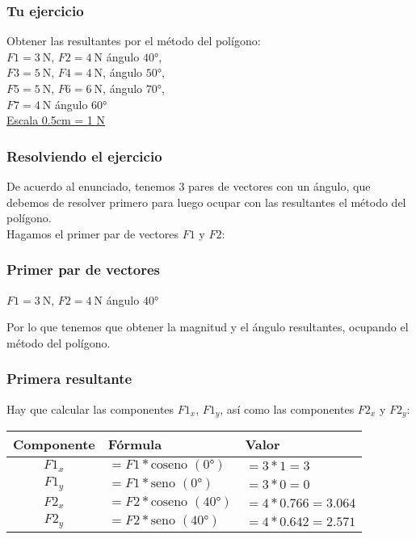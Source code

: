 \documentclass[14pt, xcolor={usenames,dvipsnames}]{beamer}
\begin{document}
\begin{frame}
\frametitle{Tu ejercicio}
Obtener las resultantes por el método del polígono:
\\[0.5em]
$F1 = \SI{3}{\newton}$, $F2 = \SI{4}{\newton}$  ángulo $\ang{40}$, \\[0.5em]
$F3 = \SI{5}{\newton}$, $F4 = \SI{4}{\newton}$, ángulo $\ang{50}$, \\[0.5em]
$F5 = \SI{5}{\newton}$, $F6 = \SI{6}{\newton}$, ángulo $\ang{70}$,\\[0.5em]
$F7 = \SI{4}{\newton}$ ángulo $\ang{60}$
\\[0.5em]
\underline{Escala 0.5cm = 1 N}
\end{frame}
\begin{frame}
\frametitle{Resolviendo el ejercicio}
De acuerdo al enunciado, tenemos 3 pares de vectores con un ángulo, que debemos de resolver primero para luego ocupar con las resultantes el método del polígono.
\\
\bigskip
\pause
Hagamos el primer par de vectores $F1$ y $F2$:
\end{frame}
\begin{frame}
\frametitle{Primer par de vectores}
$F1 = \SI{3}{\newton}$, $F2 = \SI{4}{\newton}$  ángulo $\ang{40}$
\begin{figure}
\centering
{}
\end{figure}
Por lo que tenemos que obtener la magnitud y el ángulo resultantes, ocupando el método del polígono.
\end{frame}
\begin{frame}
\frametitle{Primera resultante}
Hay que calcular las componentes $F1_{x}$, $F1_{y}$, así como las componentes $F2_{x}$ y $F2_{y}$:
\pause
\begin{table}
    \renewcommand{\arraystretch}{1.5}
\begin{tabular}{c | l | l}
Componente & Fórmula & Valor \\ \hline
$F1_{x}$ & $= F1 * \text{coseno } (\ang{0})$ & $= 3*1 = 3$ \\ \hline
$F1_{y}$ & $= F1 * \text{seno } (\ang{0})$ & $= 3*0 = 0$ \\ \hline
$F2_{x}$ & $= F2 * \text{coseno } (\ang{40})$ & $= 4*0.766 = 3.064$ \\ \hline
$F2_{y}$ & $= F2 * \text{seno } (\ang{40})$ & $= 4*0.642 = 2.571$ \\ \hline
\end{tabular}
\end{table}   
\end{frame}
\end{document}
